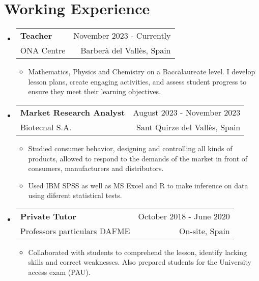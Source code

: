\documentclass[a4paper,11pt,dvipsnames]{article}
\makeatletter
\newcommand{\resumeQuadHeading}[4]{
	\item
	\begin{tabular*}{0.96\textwidth}[t]{l@{\extracolsep{\fill}}r}
		\textbf{#1} & \small #2 \\
		\small#3 & \small #4 \\
	\end{tabular*}
}
\newcommand{\resumeHeadingListStart}{
	\begin{itemize}[leftmargin=0.15in, label={}]
	}
\newcommand{\resumeHeadingListEnd}{\end{itemize}}
\makeatother
\begin{document}
	
	\section{Working Experience}	
	\resumeHeadingListStart{}
	\resumeQuadHeading{Teacher}{November 2023 - Currently}
	{ONA Centre}{Barberà del Vallès, Spain}
	\begin{itemize}[leftmargin=3em, itemsep=0.1em, topsep=2pt]
		\item \small Mathematics, Physics and Chemistry on a Baccalaureate level. I develop lesson plans, create engaging activities, and assess student progress to ensure they meet their learning objectives.
	\end{itemize}
	\resumeHeadingListEnd{}
	
	\resumeHeadingListStart{}
	\resumeQuadHeading{Market Research Analyst \tcbox{\color{white}\textbf{IBM SPSS}}\hspace*{1mm} \tcbox{\color{white}\textbf{MS Excel}}\hspace*{1mm} \tcbox{\color{white}\textbf{R}}}{August 2023 - November 2023}
	{Biotecnal S.A.}{Sant Quirze del Vallès, Spain}
	\begin{itemize}[leftmargin=3em, itemsep=0.1em, topsep=2pt]
		\item \small Studied consumer behavior, designing and controlling all kinds of products, allowed to respond to the demands of the market in front of consumers, manufacturers and distributors.
		\item \small Used IBM SPSS as well as MS Excel and R to make inference on data using diferent statistical tests.
	\end{itemize}
	\resumeHeadingListEnd{}
	
	\resumeHeadingListStart{}
	\resumeQuadHeading{Private Tutor}{October 2018 - June 2020}
	{Professors particulars DAFME}{On-site, Spain}
	\begin{itemize}[leftmargin=3em, itemsep=0.1em, topsep=2pt]
		\item \small Collaborated with students to comprehend the lesson, identify lacking skills and correct weaknesses. Also prepared students for the University access exam (PAU).
	\end{itemize}
	\resumeHeadingListEnd{}
	
\end{document}
